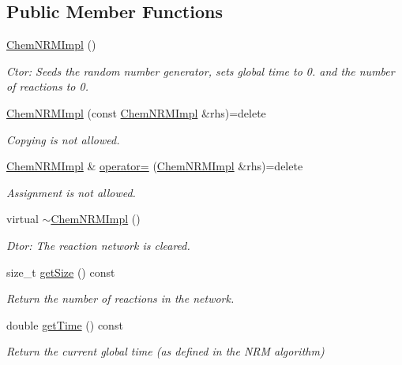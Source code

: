 \subsection*{Public Member Functions}
\begin{DoxyCompactItemize}
\item 
\hyperlink{classChemNRMImpl_a4c4a0173b3d449fd4abd651a686cd3e8}{Chem\+N\+R\+M\+Impl} ()
\begin{DoxyCompactList}\small\item\em Ctor\+: Seeds the random number generator, sets global time to 0. and the number of reactions to 0. \end{DoxyCompactList}\item 
\hyperlink{classChemNRMImpl_a3005ba8e7b13e722ea4334d986bc5615}{Chem\+N\+R\+M\+Impl} (const \hyperlink{classChemNRMImpl}{Chem\+N\+R\+M\+Impl} \&rhs)=delete
\begin{DoxyCompactList}\small\item\em Copying is not allowed. \end{DoxyCompactList}\item 
\hyperlink{classChemNRMImpl}{Chem\+N\+R\+M\+Impl} \& \hyperlink{classChemNRMImpl_a05a2c41acff85971fe6e054e29ef6d1d}{operator=} (\hyperlink{classChemNRMImpl}{Chem\+N\+R\+M\+Impl} \&rhs)=delete
\begin{DoxyCompactList}\small\item\em Assignment is not allowed. \end{DoxyCompactList}\item 
virtual \hyperlink{classChemNRMImpl_aca8d50551cdb52e67f1707df35a60c46}{$\sim$\+Chem\+N\+R\+M\+Impl} ()
\begin{DoxyCompactList}\small\item\em Dtor\+: The reaction network is cleared. \end{DoxyCompactList}\item 
size\+\_\+t \hyperlink{classChemNRMImpl_ac48e214385413158609cf016caaaac6b}{get\+Size} () const 
\begin{DoxyCompactList}\small\item\em Return the number of reactions in the network. \end{DoxyCompactList}\item 
double \hyperlink{classChemNRMImpl_a94194658c0574c4a8673683305db5eea}{get\+Time} () const 
\begin{DoxyCompactList}\small\item\em Return the current global time (as defined in the N\+R\+M algorithm) \end{DoxyCompactList}\item 

\end{DoxyCompactItemize}
